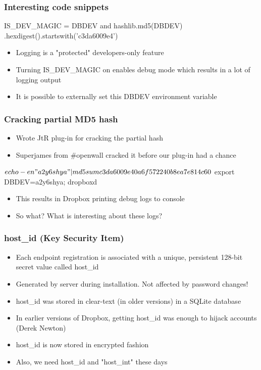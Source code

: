 \documentclass{beamer}
\begin{document}
\begin{frame}[fragile]
\frametitle{Interesting code snippets}
\begin{python}
    IS_DEV_MAGIC = DBDEV and hashlib.md5(DBDEV)
        .hexdigest().startswith('c3da6009e4')
\end{python}
\begin{itemize}
\itemsep 2em
\item Logging is a "protected" developers-only feature
\item Turning IS\_DEV\_MAGIC on enables debug mode which results in a lot of logging output
\item It is possible to externally set this DBDEV environment variable
\end{itemize}
\end{frame}

\begin{frame}[fragile]
\frametitle{Cracking partial MD5 hash}
\begin{itemize}
\itemsep 1.8em
\item Wrote JtR plug-in for cracking the partial hash
\item Superjames from \#openwall cracked it before our plug-in had a chance
\end{itemize}
\begin{python}
    $ echo -en "a2y6shya" | md5sum
       c3da6009e40a6f572240b8ea7e814c60

    $ export DBDEV=a2y6shya; dropboxd
\end{python}
\begin{itemize}
\item This results in Dropbox printing debug logs to console
\item So what? What is interesting about these logs?
\end{itemize}
\end{frame}

\begin{frame}
\frametitle{host\_id (Key Security Item)}
\begin{itemize}
\itemsep 1em
\item Each endpoint registration is associated with a unique, persistent 128-bit secret value called host\_id

\item Generated by server during installation. Not affected by password changes!

\item host\_id was stored in clear-text (in older versions) in a SQLite database

\item In earlier versions of Dropbox, getting host\_id was enough to hijack
accounts (Derek Newton)

\item host\_id is now stored in encrypted fashion

\item Also, we need host\_id and "host\_int" these days

\end{itemize}
\end{frame}
\end{document}
